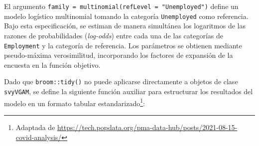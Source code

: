 \documentclass[
  spanish,
  12pt,
]{book}
\begin{document}
El argumento \texttt{family\ =\ multinomial(refLevel\ =\ "Unemployed")} define un modelo logístico multinomial tomando la categoría \texttt{Unemployed} como referencia. Bajo esta especificación, se estiman de manera simultánea los logaritmos de las razones de probabilidades (\emph{log-odds}) entre cada una de las categorías de \texttt{Employment} y la categoría de referencia. Los parámetros se obtienen mediante pseudo-máxima verosimilitud, incorporando los factores de expansión de la encuesta en la función objetivo.

Dado que \texttt{broom::tidy()} no puede aplicarse directamente a objetos de clase \texttt{svyVGAM}, se define la siguiente función auxiliar para estructurar los resultados del modelo en un formato tabular estandarizado\footnote{Adaptada de \url{https://tech.popdata.org/pma-data-hub/posts/2021-08-15-covid-analysis/}}:
\end{document}
